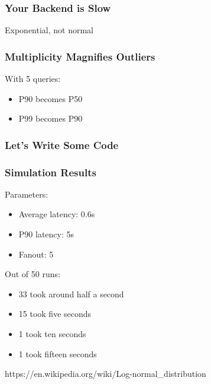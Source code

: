 \begin{frame}
\frametitle{Your Backend is Slow}

Exponential, not normal

\end{frame}

\begin{frame}
\frametitle{Multiplicity Magnifies Outliers}

With 5 queries:

\begin{itemize}
\item P90 becomes P50
\item P99 becomes P90
\end{itemize}

\end{frame}

\begin{frame}
\frametitle{Let's Write Some Code}



\end{frame}

\begin{frame}
\frametitle{Simulation Results}

Parameters:
\begin{itemize}
\item Average latency: 0.6s
\item P90 latency: 5s
\item Fanout: 5
\end{itemize}

Out of 50 runs:

\begin{itemize}
\item 33 took around half a second
\item 15 took five seconds
\item 1 took ten seconds
\item 1 took fifteen seconds
\end{itemize}
\end{frame}

https://en.wikipedia.org/wiki/Log-normal_distribution


